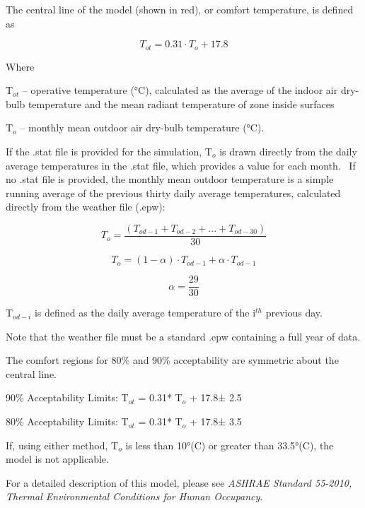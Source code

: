 The central line of the model (shown in red), or comfort temperature, is defined as

\begin{equation}
{T_{ot}} = 0.31\cdot {T_o} + 17.8
\end{equation}

Where

T\(_{ot}\) -- operative temperature (°C), calculated as the average of the indoor air dry-bulb temperature and the mean radiant temperature of zone inside surfaces

T\(_{o}\) -- monthly mean outdoor air dry-bulb temperature (°C).

If the .stat file is provided for the simulation, T\(_{o}\) is drawn directly from the daily average temperatures in the .stat file, which provides a value for each month.~ If no .stat file is provided, the monthly mean outdoor temperature is a simple running average of the previous thirty daily average temperatures, calculated directly from the weather file (.epw):

\begin{equation}
{T_o} = \frac{{\left( {{T_{od - 1}} + {T_{od - 2}} + ... + {T_{od - 30}}} \right)}}{{30}}
\end{equation}

\begin{equation}
{T_o} = (1 - \alpha )\cdot {T_{od - 1}} + \alpha \cdot {T_{od - 1}}
\end{equation}

\begin{equation}
\alpha  = \frac{{29}}{{30}}
\end{equation}

T\(_{od-i}\) is defined as the daily average temperature of the i\(^{th}\) previous day.

Note that the weather file must be a standard .epw containing a full year of data.

The comfort regions for 80\% and 90\% acceptability are symmetric about the central line.

90\% Acceptability Limits: T\(_{ot}\) = 0.31* T\(_{o}\) + 17.8± 2.5

80\% Acceptability Limits: T\(_{ot}\) = 0.31* T\(_{o}\) + 17.8± 3.5

If, using either method, T\(_{o}\) is less than 10°(C) or greater than 33.5°(C), the model is not applicable.

For a detailed description of this model, please see \emph{ASHRAE Standard 55-2010, Thermal Environmental Conditions for Human Occupancy}.

